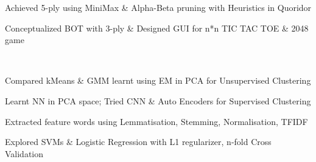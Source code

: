\documentclass[]{Kauts}
\begin{document}
\begin{minipage}[t]{0.69\textwidth}
\detail{}
\begin{tightemize}
\item Achieved 5-ply using MiniMax \& Alpha-Beta pruning with Heuristics in Quoridor\\
\item Conceptualized BOT with 3-ply \& Designed GUI for n*n TIC TAC TOE \& 2048 game\\
\end{tightemize}
\projectsep


\\
\detail{}
\begin{tightemize}
\item Compared kMeans \& GMM learnt using EM in PCA for Unsupervised Clustering
\item Learnt NN in PCA space; Tried CNN \& Auto Encoders for Supervised Clustering
\end{tightemize}
\projectsep

\detail{}
\begin{tightemize}
\item Extracted feature words using Lemmatisation, Stemming, Normalisation, TFIDF
\item Explored SVMs \& Logistic Regression with L1 regularizer, n-fold Cross Validation
\end{tightemize}
\projectsep

\projectsep

\end{minipage} 
\end{document}
